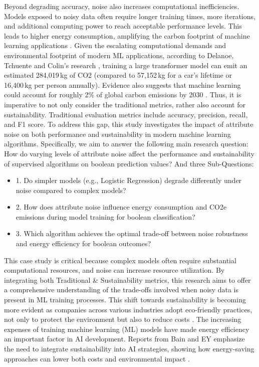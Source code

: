 \documentclass[conference]{IEEEtran}
\begin{document}
\newline
\newline
Beyond degrading accuracy, noise also increases computational inefficiencies. Models exposed to noisy data often require longer training times, more iterations, and additional computing power to reach acceptable performance levels. This leads to higher energy consumption, amplifying the carbon footprint of machine learning applications \cite{sciencedirect}.
\newline
\newline
Given the escalating computational demands and environmental footprint of modern ML applications, according to Delanoe, Tchuente and Colin’s research \cite{DELAN}, training a large transformer model can emit an estimated 284,019 kg of CO2 (compared to 57,152 kg for a car’s lifetime or 16,400 kg per person annually). Evidence also suggests that machine learning could account for roughly 2\% of global carbon emissions by 2030 \cite{carbon_emissions}.
Thus, it is imperative to not only consider the traditional metrics, rather also account for sustainability. Traditional evaluation metrics include accuracy, precision, recall, and F1 score.
\newline 
\newline
To address this gap, this study investigates the impact of attribute noise on both performance and sustainability in modern machine learning algorithms. Specifically, we aim to answer the following main research question:
How do varying levels of attribute noise affect the performance and sustainability of supervised algorithms on boolean prediction values?
\newline
\newline
And three Sub-Questions:
\begin{itemize}
    \item 1. Do simpler models (e.g., Logistic Regression) degrade differently under noise compared to complex models?
    \item 2. How does attribute noise influence energy consumption and CO2e emissions during model training for boolean classification?
    \item 3. Which algorithm achieves the optimal trade-off between noise robustness and energy efficiency for boolean outcomes?
\end{itemize}
\newline 
\newline
This case study is critical because complex models often require substantial computational resources, and noise can increase resource utilization. By integrating both Traditional & Sustainability metrics, this research aims to offer a comprehensive understanding of the trade-offs involved when noisy data is present in ML training processes. This shift towards sustainability is becoming more evident as companies across various industries adopt eco-friendly practices, not only to protect the environment but also to reduce costs \cite{ey_ai_sustainability}. The increasing expenses of training machine learning (ML) models have made energy efficiency an important factor in AI development. Reports from Bain and EY emphasize the need to integrate sustainability into AI strategies, showing how energy-saving approaches can lower both costs and environmental impact \cite{bain_ai_sustainability}. 
\end{document}
